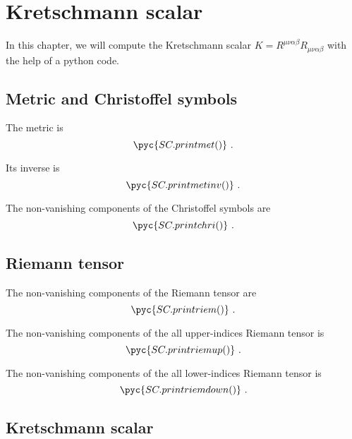 \appendix

\chapter{Kretschmann scalar}

    In this chapter, we will compute the Kretschmann scalar $K = R^{\mu\nu\alpha\beta} R_{\mu\nu\alpha\beta}$ with the help of a python code.

\section{Metric and Christoffel symbols} \label{chri}

    The metric is 
    \begin{equation*}
        \pyc{SC.printmet()} ~.
    \end{equation*}

    Its inverse is 
    \begin{equation*}
        \pyc{SC.printmetinv()} ~.
    \end{equation*}

    The non-vanishing components of the Christoffel symbols are
    \begin{equation*}
        \pyc{SC.printchri()} ~.
    \end{equation*}

\section{Riemann tensor}

    The non-vanishing components of the Riemann tensor are
    \begin{equation*}
        \pyc{SC.printriem()} ~.
    \end{equation*}

    The non-vanishing components of the all upper-indices Riemann tensor is 
    \begin{equation*}
        \pyc{SC.printriemup()} ~.
    \end{equation*}

    The non-vanishing components of the all lower-indices Riemann tensor is
    \begin{equation*}
        \pyc{SC.printriemdown()} ~.
    \end{equation*}

\section{Kretschmann scalar}
    
